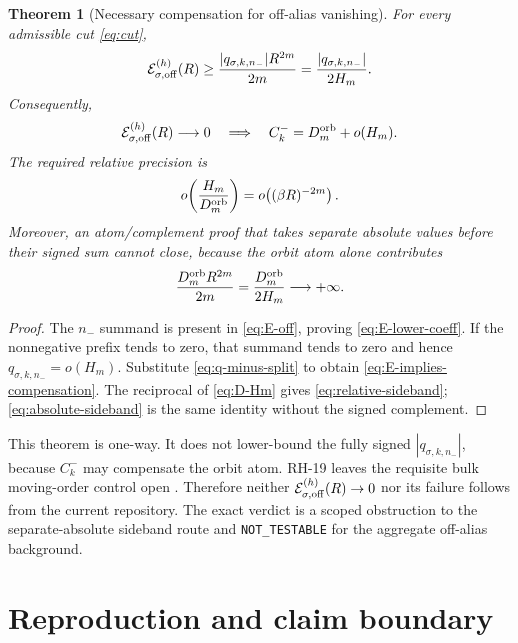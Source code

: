\documentclass[11pt]{article}
\newtheorem{theorem}{Theorem}[section]
\theoremstyle{remark}
\newcommand{\cE}{\mathcal E}
\begin{document}
\begin{theorem}[Necessary compensation for off-alias vanishing]
\label{thm:necessary-compensation}
For every admissible cut \eqref{eq:cut},
\begin{equation}\label{eq:E-lower-coeff}
 \cE_{\sigma,\rm off}^{(h)}(R)
 \ge\frac{|q_{\sigma,k,n_-}|R^{2m}}{2m}
 =\frac{|q_{\sigma,k,n_-}|}{2H_m}.
\end{equation}
Consequently,
\begin{equation}\label{eq:E-implies-compensation}
 \cE_{\sigma,\rm off}^{(h)}(R)\longrightarrow0
 \quad\Longrightarrow\quad
 C_k^-=D_m^{\rm orb}+o(H_m).
\end{equation}
The required relative precision is
\begin{equation}\label{eq:relative-sideband}
 o\!\left(\frac{H_m}{D_m^{\rm orb}}\right)
 =o\!\left((\beta R)^{-2m}\right).
\end{equation}
Moreover, an atom/complement proof that takes separate absolute values
before their signed sum cannot close, because the orbit atom alone contributes
\begin{equation}\label{eq:absolute-sideband}
 \frac{D_m^{\rm orb}R^{2m}}{2m}
 =\frac{D_m^{\rm orb}}{2H_m}
 \longrightarrow+\infty.
\end{equation}
\end{theorem}

\begin{proof}
The $n_-$ summand is present in \eqref{eq:E-off}, proving
\eqref{eq:E-lower-coeff}.  If the nonnegative prefix tends to zero, that
summand tends to zero and hence
$q_{\sigma,k,n_-}=o(H_m)$.  Substitute \eqref{eq:q-minus-split} to obtain
\eqref{eq:E-implies-compensation}.  The reciprocal of \eqref{eq:D-Hm}
gives \eqref{eq:relative-sideband}; \eqref{eq:absolute-sideband} is the same
identity without the signed complement.
\end{proof}

This theorem is one-way.  It does not lower-bound the fully signed
$|q_{\sigma,k,n_-}|$, because $C_k^-$ may compensate the orbit atom.  RH-19
leaves the requisite bulk moving-order control open
\citep{WangComplement2026}.  Therefore neither
$\cE_{\sigma,\rm off}^{(h)}(R)\to0$ nor its failure follows from the current
repository.  The exact verdict is a scoped obstruction to the
separate-absolute sideband route and
\texttt{NOT\_TESTABLE} for the aggregate off-alias background.

\section{Reproduction and claim boundary}
\end{document}
